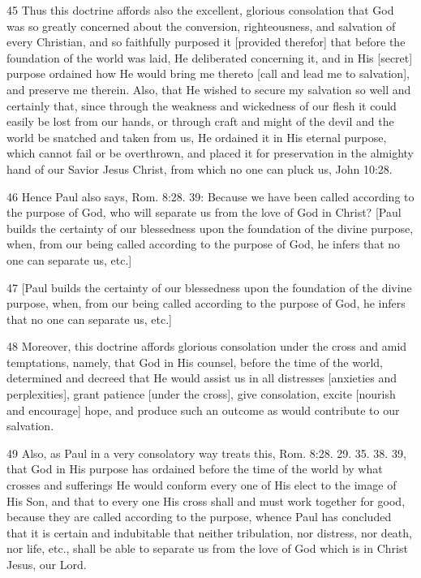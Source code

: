 {45 Thus this doctrine affords also the excellent, glorious consolation that God was so greatly concerned about the conversion, righteousness, and salvation of every Christian, and so faithfully purposed it [provided therefor] that before the foundation of the world was laid, He deliberated concerning it, and in His [secret] purpose ordained how He would bring me thereto [call and lead me to salvation], and preserve me therein. Also, that He wished to secure my salvation so well and certainly that, since through the weakness and wickedness of our flesh it could easily be lost from our hands, or through craft and might of the devil and the world be snatched and taken from us, He ordained it in His eternal purpose, which cannot fail or be overthrown, and placed it for preservation in the almighty hand of our Savior Jesus Christ, from which no one can pluck us, John 10:28.

46 Hence Paul also says, Rom. 8:28. 39: Because we have been called according to the purpose of God, who will separate us from the love of God in Christ? [Paul builds the certainty of our blessedness upon the foundation of the divine purpose, when, from our being called according to the purpose of God, he infers that no one can separate us, etc.]

47 [Paul builds the certainty of our blessedness upon the foundation of the divine purpose, when, from our being called according to the purpose of God, he infers that no one can separate us, etc.]

48 Moreover, this doctrine affords glorious consolation under the cross and amid temptations, namely, that God in His counsel, before the time of the world, determined and decreed that He would assist us in all distresses [anxieties and perplexities], grant patience [under the cross], give consolation, excite [nourish and encourage] hope, and produce such an outcome as would contribute to our salvation.

49 Also, as Paul in a very consolatory way treats this, Rom. 8:28. 29. 35. 38. 39, that God in His purpose has ordained before the time of the world by what crosses and sufferings He would conform every one of His elect to the image of His Son, and that to every one His cross shall and must work together for good, because they are called according to the purpose, whence Paul has concluded that it is certain and indubitable that neither tribulation, nor distress, nor death, nor life, etc., shall be able to separate us from the love of God which is in Christ Jesus, our Lord.

}

